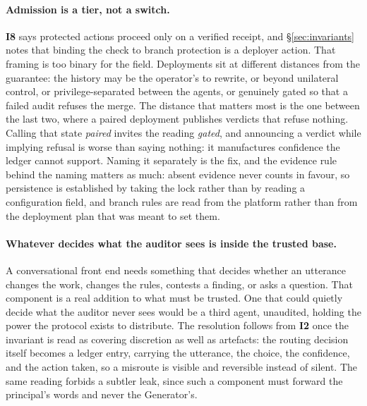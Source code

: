 \documentclass[11pt,letterpaper]{article}
\newcommand{\invariant}[1]{\textbf{I#1}}
\begin{document}
\paragraph{Admission is a tier, not a switch.} \invariant{8} says protected actions proceed only on a verified receipt, and \S\ref{sec:invariants} notes that binding the check to branch protection is a deployer action. That framing is too binary for the field. Deployments sit at different distances from the guarantee: the history may be the operator's to rewrite, or beyond unilateral control, or privilege-separated between the agents, or genuinely gated so that a failed audit refuses the merge. The distance that matters most is the one between the last two, where a paired deployment publishes verdicts that refuse nothing. Calling that state \emph{paired} invites the reading \emph{gated}, and announcing a verdict while implying refusal is worse than saying nothing: it manufactures confidence the ledger cannot support. Naming it separately is the fix, and the evidence rule behind the naming matters as much: absent evidence never counts in favour, so persistence is established by taking the lock rather than by reading a configuration field, and branch rules are read from the platform rather than from the deployment plan that was meant to set them.

\paragraph{Whatever decides what the auditor sees is inside the trusted base.} A conversational front end needs something that decides whether an utterance changes the work, changes the rules, contests a finding, or asks a question. That component is a real addition to what must be trusted. One that could quietly decide what the auditor never sees would be a third agent, unaudited, holding the power the protocol exists to distribute. The resolution follows from \invariant{2} once the invariant is read as covering discretion as well as artefacts: the routing decision itself becomes a ledger entry, carrying the utterance, the choice, the confidence, and the action taken, so a misroute is visible and reversible instead of silent. The same reading forbids a subtler leak, since such a component must forward the principal's words and never the Generator's.
\end{document}
